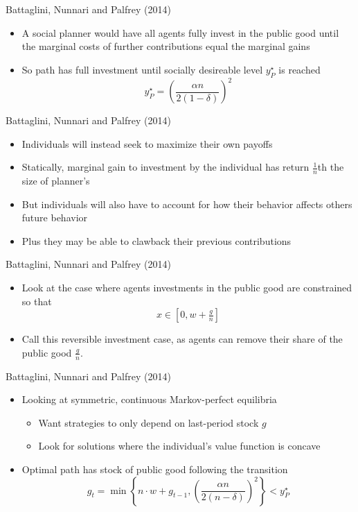 \begin{frame}{Battaglini, Nunnari and Palfrey (2014)} 	\begin{itemize} 		\item A social planner would have all agents fully invest in the public good until the marginal costs of further contributions equal the marginal gains 		\item So path has full investment until socially desireable level $y^\star_P$ is reached 		$$	y^\star_P=\left(\dfrac{\alpha n}{2(1-\delta)}\right)^2$$ 	\end{itemize} \end{frame}
\begin{frame}{Battaglini, Nunnari and Palfrey (2014)} 	\begin{itemize} 		\item Individuals will instead seek to maximize their own payoffs 		\item Statically, marginal gain to investment by the individual has return $\tfrac{1}{n}$th the size of planner's \pause 		\item But individuals will also have to account for how their behavior affects others future behavior\pause 		\item Plus they may be able to clawback their previous contributions 	\end{itemize} \end{frame}
\begin{frame}{Battaglini, Nunnari and Palfrey (2014)} 	\begin{itemize} 		\item Look at the case where agents investments in the public good are constrained so that 		$$ x\in\left[0,w+\tfrac{g}{n}\right] $$ 		\item Call this reversible investment case, as agents can remove their share of the public good $\tfrac{g}{n}$. 	\end{itemize} \end{frame}
\begin{frame}{Battaglini, Nunnari and Palfrey (2014)} 	\begin{itemize} 		\item Looking at symmetric, continuous Markov-perfect equilibria 		\begin{itemize} 			\item Want strategies to only depend on last-period stock $g$ 			\item Look for solutions where the individual's value function is concave 		\end{itemize}\pause 		\item Optimal path has stock of public good following the transition 			$$g_t=\min\left\{n\cdot w+g_{t-1} , \left(\dfrac{\alpha n}{2(n-\delta)}\right)^2  \right\}<y^\star_P $$ 	\end{itemize} \end{frame}
